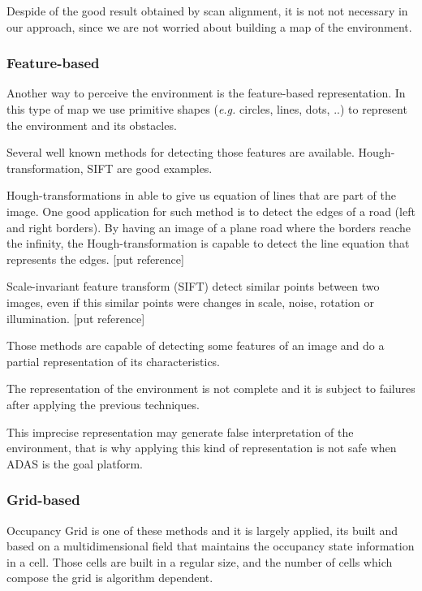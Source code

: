 Despide of the good result obtained by scan alignment, it is not not necessary in our approach, since we are not worried about building a map of the environment. 

\subsubsection{Feature-based}

Another way to perceive the environment is the feature-based representation. In this type of map we use primitive shapes (\textit{e.g.} circles, lines, dots, ..) to represent the environment and its obstacles.

Several well known methods for detecting those features are available. Hough-transformation, SIFT are good examples. 

Hough-transformations in able to give us equation of lines that are part of the image. One good application for such method is to detect the edges of a road (left and right borders). By having an image of a plane road where the borders reache the infinity, the Hough-transformation is capable to detect the line equation that represents the edges. [put reference]

Scale-invariant feature transform (SIFT) detect similar points between two images, even if this similar points were changes in scale, noise, rotation or illumination. [put reference] 

Those methods are capable of detecting some features of an image and do a partial representation of its characteristics. 

The representation of the environment is not complete and it is subject to failures after applying the previous techniques.

This imprecise representation may generate false interpretation of the environment, that is why applying this kind of representation is not safe when ADAS is the goal platform.

\subsubsection{Grid-based}
\label{ch02:gridbased}

Occupancy Grid is one of these methods and it is largely applied, its built and based on a multidimensional field that maintains the occupancy state information in a cell\cite{Elfes:1989:UOG:68491.68495}. Those cells are built in a regular size, and the number of cells which compose the grid is algorithm dependent.

